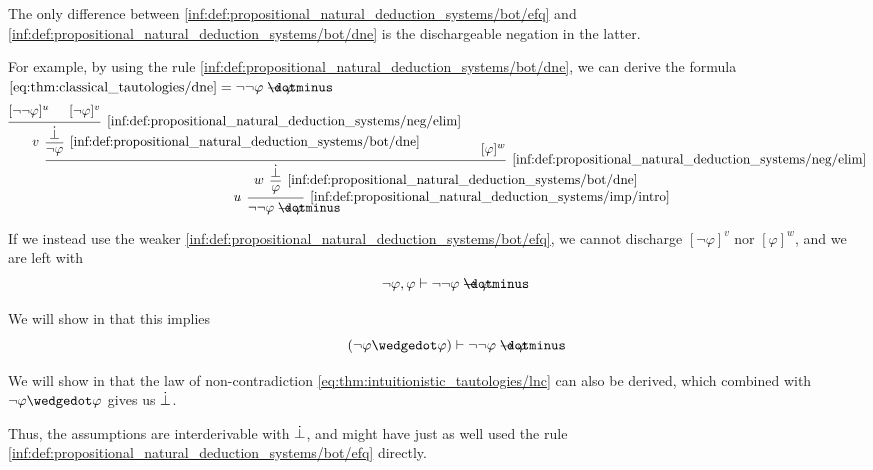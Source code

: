 \begin{example}\label{ex:natural_deduction_efq_vs_dne}
  The only difference between \ref{inf:def:propositional_natural_deduction_systems/bot/efq} and \ref{inf:def:propositional_natural_deduction_systems/bot/dne} is the dischargeable negation in the latter.

  For example, by using the rule \ref{inf:def:propositional_natural_deduction_systems/bot/dne}, we can derive the formula \( \eqref{eq:thm:classical_tautologies/dne} = \neg \neg \varphi \synimplies \varphi \):
  \begin{equation*}
    \begin{prooftree}
      \hypo{ [\neg\neg\varphi]^u }
      \hypo{ [\neg\varphi]^v }
      \infer2[\ref{inf:def:propositional_natural_deduction_systems/neg/elim}]{ \synbot }
      \infer[left label=\( v \)]1[\ref{inf:def:propositional_natural_deduction_systems/bot/dne}]{ \neg\varphi }

      \hypo{ [\varphi]^w }
      \infer2[\ref{inf:def:propositional_natural_deduction_systems/neg/elim}]{ \synbot }
      \infer[left label=\( w \)]1[\ref{inf:def:propositional_natural_deduction_systems/bot/dne}]{ \varphi }
      \infer[left label=\( u \)]1[\ref{inf:def:propositional_natural_deduction_systems/imp/intro}]{ \neg\neg\varphi \synimplies \varphi }
    \end{prooftree}
  \end{equation*}

  If we instead use the weaker \ref{inf:def:propositional_natural_deduction_systems/bot/efq}, we cannot discharge \( [\neg\varphi]^v \) nor \( [\varphi]^w \), and we are left with
  \begin{equation*}
    \neg\varphi, \varphi \vdash \neg\neg\varphi \synimplies \varphi.
  \end{equation*}

  We will show in  that this implies
  \begin{equation*}
    (\neg\varphi \synwedge \varphi) \vdash \neg\neg\varphi \synimplies \varphi
  \end{equation*}

  We will show in  that the law of non-contradiction \eqref{eq:thm:intuitionistic_tautologies/lnc} can also be derived, which combined with \( \neg\varphi \synwedge \varphi \) gives us \( \dot{\bot} \).

  Thus, the assumptions are interderivable with \( \dot{\bot} \), and might have just as well used the rule \ref{inf:def:propositional_natural_deduction_systems/bot/efq} directly.
\end{example}

